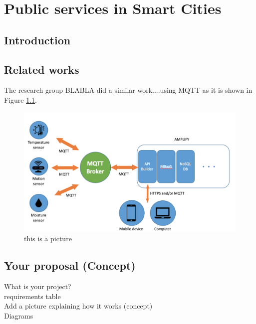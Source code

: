 \chapter{Public services in Smart Cities}
\label{intro} 



\section{Introduction}
\label{sec:1}


\section{Related works}
\label{sec:2}

The research group BLABLA \cite{cheng2015building} did a similar work....using MQTT as it is shown in Figure \ref{fig:1}.
\begin{figure}
\sidecaption
\includegraphics[scale=.09]{images/figure.png}
\caption{this is a picture}
\label{fig:1}
\end{figure}


\section{Your proposal (Concept)}
\label{sec:3}
   What is your project?
\\ requirements table
\\ Add a picture explaining how it works (concept)
\\ Diagrams
\\

